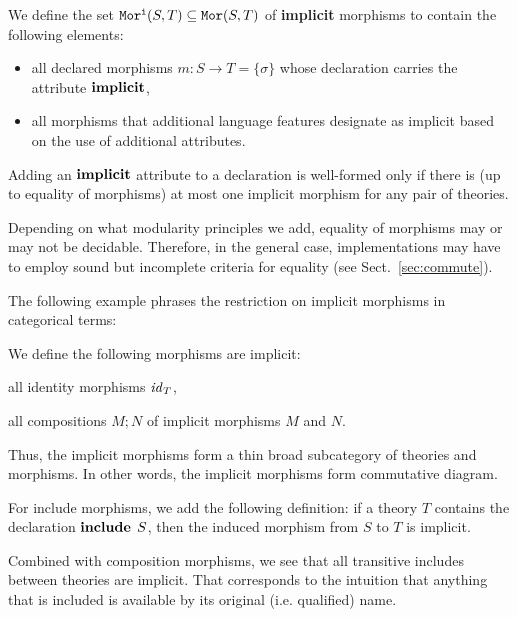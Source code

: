 \begin{definition}
We define the set $\mathtt{Mor^i}(S,T)\subseteq\mathtt{Mor}(S,T)$ of \textbf{implicit} morphisms to contain the following elements:
\begin{itemize}
 \item all declared morphisms $m:S\to T=\{\sigma\}$ whose declaration carries the attribute $\operatorname{\mathbf{implicit}}$,
 \item all morphisms that additional language features designate as implicit based on the use of additional attributes.
\end{itemize}

Adding an $\operatorname{\mathbf{implicit}}$ attribute to a declaration is well-formed only if there is (up to equality of morphisms) at most one implicit morphism for any pair of theories.
\end{definition}

\begin{modexp}
Depending on what modularity principles we add, equality of morphisms may or may not be decidable.
Therefore, in the general case, implementations may have to employ sound but incomplete criteria for equality (see Sect.~\ref{sec:commute}).
\end{modexp}

\begin{modexp}
The following example phrases the restriction on implicit morphisms in categorical terms:
\begin{example}\label{impl:cat}
We define the following morphisms are implicit:
\begin{compactitem}
 \item all identity morphisms $\mathit{id}_{T}$,
 \item all compositions $M;N$ of implicit morphisms $M$ and $N$.
\end{compactitem}
Thus, the implicit morphisms form a thin broad subcategory of theories and morphisms.
In other words, the implicit morphisms form commutative diagram.
\end{example}
\end{modexp}

\begin{example}\label{impl:incl}
For include morphisms, we add the following definition: if a theory $T$ contains the declaration $\operatorname{\mathbf{include}}{\;S}$, then the induced morphism from $S$ to $T$ is implicit.

Combined with composition morphisms, we see that all transitive includes between theories are implicit.
That corresponds to the intuition that anything that is included is available by its original (i.e. qualified) name.
\end{example}

